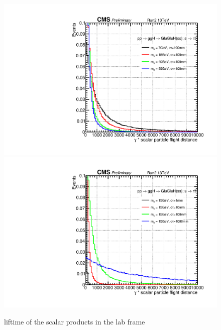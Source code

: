 \begin{figure}[h!]
  \caption{liftime of the scalar products in the lab frame}
  \label{fig:scalarpt}
  \centering
  \includegraphics[width=0.47\linewidth]{figs/Scalar_gammactau100mm.pdf}
  \includegraphics[width=0.47\linewidth]{figs/Scalar_gammactau15GeV.pdf}
\end{figure}






